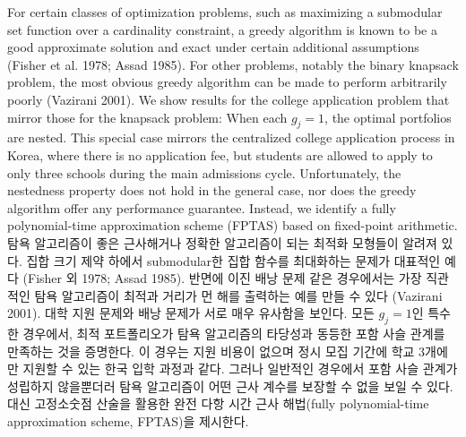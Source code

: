 \documentclass[11pt]{article} %
\theoremstyle{definition}
\theoremstyle{definition}
\begin{document}
\ifen
For certain classes of optimization problems, such as maximizing a submodular set function over a cardinality constraint, a greedy algorithm is known to be a good approximate solution and exact under certain additional assumptions (Fisher et al. 1978; Assad 1985). For other problems, notably the binary knapsack problem, the most obvious greedy algorithm can be made to perform arbitrarily poorly (Vazirani 2001). We show results for the college application problem that mirror those for the knapsack problem: When each $g_j = 1$, the optimal portfolios are nested. This special case mirrors the centralized college application process in Korea, where there is no application fee, but students are allowed to apply to only three schools during the main admissions cycle. Unfortunately, the nestedness property does not hold in the general case, nor does the greedy algorithm offer any performance guarantee. Instead, we identify a fully polynomial-time approximation scheme (FPTAS) based on fixed-point arithmetic. 
\else
탐욕 알고리즘이 좋은 근사해거나 정확한 알고리즘이 되는 최적화 모형들이 알려져 있다. 집합 크기 제약 하에서 submodular한 집합 함수를 최대화하는 문제가 대표적인 예다 (Fisher 외 1978; Assad 1985). 반면에 이진 배낭 문제 같은 경우에서는 가장 직관적인 탐욕 알고리즘이 최적과 거리가 먼 해를 출력하는 예를 만들 수 있다 (Vazirani 2001). 대학 지원 문제와 배낭 문제가 서로 매우 유사함을 보인다. 모든 $g_j=1$인 특수한 경우에서, 최적 포트폴리오가 탐욕 알고리즘의 타당성과 동등한 포함 사슬 관계를 만족하는 것을 증명한다. 이 경우는 지원 비용이 없으며 정시 모집 기간에 학교 3개에만 지원할 수 있는 한국 입학 과정과 같다. 그러나 일반적인 경우에서 포함 사슬 관계가 성립하지 않을뿐더러 탐욕 알고리즘이 어떤 근사 계수를 보장할 수 없을 보일 수 있다. 대신 고정소숫점 산술을 활용한 완전 다항 시간 근사 해법(fully polynomial-time approximation scheme, FPTAS)을 제시한다.
\fi
\end{document}
